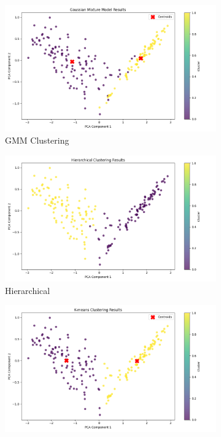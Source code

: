 \documentclass[a4paper,12pt]{report}
\begin{document}
\begin{figure}[H]
    \centering
    \begin{subfigure}[b]{0.32\textwidth}
        \centering
        \includegraphics[width=\textwidth]{images/clustering/gmm_clustering.png}
        \caption{GMM Clustering}
        \label{fig:gmm_cluster}
    \end{subfigure}
    \hfill
    \begin{subfigure}[b]{0.32\textwidth}
        \centering
        \includegraphics[width=\textwidth]{images/clustering/hierarchical_clustering.png}
        \caption{Hierarchical}
        \label{fig:hierarchical_cluster}
    \end{subfigure}
    \hfill
    \begin{subfigure}[b]{0.32\textwidth}
        \centering
        \includegraphics[width=\textwidth]{images/clustering/kmeans_clustering.png}

\end{subfigure}
\end{figure}
\end{document}
